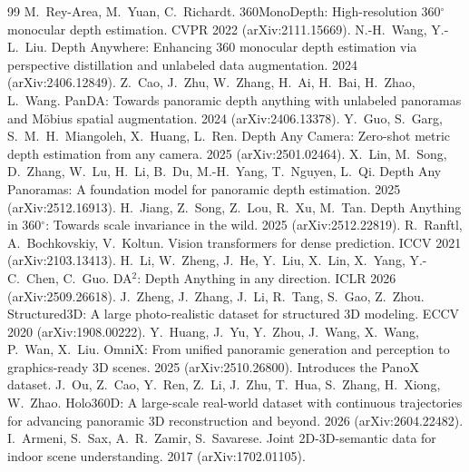 \documentclass{article}
\begin{document}
\begin{thebibliography}{99}
 M.~Rey-Area, M.~Yuan, C.~Richardt. 360MonoDepth: High-resolution 360$^\circ$ monocular depth estimation. CVPR 2022 (arXiv:2111.15669).
 N.-H.~Wang, Y.-L.~Liu. Depth Anywhere: Enhancing 360 monocular depth estimation via perspective distillation and unlabeled data augmentation. 2024 (arXiv:2406.12849).
 Z.~Cao, J.~Zhu, W.~Zhang, H.~Ai, H.~Bai, H.~Zhao, L.~Wang. PanDA: Towards panoramic depth anything with unlabeled panoramas and M\"obius spatial augmentation. 2024 (arXiv:2406.13378).
 Y.~Guo, S.~Garg, S.~M.~H.~Miangoleh, X.~Huang, L.~Ren. Depth Any Camera: Zero-shot metric depth estimation from any camera. 2025 (arXiv:2501.02464).
 X.~Lin, M.~Song, D.~Zhang, W.~Lu, H.~Li, B.~Du, M.-H.~Yang, T.~Nguyen, L.~Qi. Depth Any Panoramas: A foundation model for panoramic depth estimation. 2025 (arXiv:2512.16913).
 H.~Jiang, Z.~Song, Z.~Lou, R.~Xu, M.~Tan. Depth Anything in 360$^\circ$: Towards scale invariance in the wild. 2025 (arXiv:2512.22819).
 R.~Ranftl, A.~Bochkovskiy, V.~Koltun. Vision transformers for dense prediction. ICCV 2021 (arXiv:2103.13413).
 H.~Li, W.~Zheng, J.~He, Y.~Liu, X.~Lin, X.~Yang, Y.-C.~Chen, C.~Guo. DA$^2$: Depth Anything in any direction. ICLR 2026 (arXiv:2509.26618).
 J.~Zheng, J.~Zhang, J.~Li, R.~Tang, S.~Gao, Z.~Zhou. Structured3D: A large photo-realistic dataset for structured 3D modeling. ECCV 2020 (arXiv:1908.00222).
 Y.~Huang, J.~Yu, Y.~Zhou, J.~Wang, X.~Wang, P.~Wan, X.~Liu. OmniX: From unified panoramic generation and perception to graphics-ready 3D scenes. 2025 (arXiv:2510.26800). Introduces the PanoX dataset.
 J.~Ou, Z.~Cao, Y.~Ren, Z.~Li, J.~Zhu, T.~Hua, S.~Zhang, H.~Xiong, W.~Zhao. Holo360D: A large-scale real-world dataset with continuous trajectories for advancing panoramic 3D reconstruction and beyond. 2026 (arXiv:2604.22482).
 I.~Armeni, S.~Sax, A.~R.~Zamir, S.~Savarese. Joint 2D-3D-semantic data for indoor scene understanding. 2017 (arXiv:1702.01105).
\end{thebibliography}

\appendix
\end{document}

